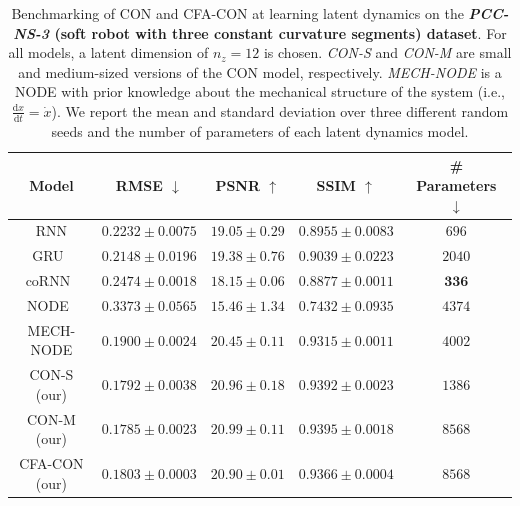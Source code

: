 \begin{table}[ht]
    \centering
    \begin{small}
    \begin{tabular}{c c c c c}
         \toprule
         \textbf{Model} & \textbf{RMSE} $\downarrow$ & \textbf{PSNR} $\uparrow$ & \textbf{SSIM} $\uparrow$ & \textbf{\# Parameters} $\downarrow$ \\
         \midrule
         RNN & $0.2232 \pm 0.0075$ & $19.05 \pm 0.29$ & $0.8955 \pm 0.0083$ & $696$\\
         GRU~\cite{cho2014learning} & $0.2148 \pm 0.0196$ & $19.38 \pm 0.76$ & $0.9039 \pm 0.0223$ & $2040$\\
         coRNN~\cite{rusch2020coupled} & $0.2474 \pm 0.0018$ & $18.15 \pm 0.06$ & $0.8877 \pm 0.0011$ & $\mathbf{336}$\\
         NODE~\cite{chen2018neural} & $0.3373 \pm 0.0565$ & $15.46 \pm 1.34$ & $0.7432 \pm 0.0935$ & $4374$\\
         MECH-NODE & $0.1900 \pm 0.0024$ & $20.45 \pm 0.11$ & $0.9315 \pm 0.0011$ & $4002$\\
         CON-S (our) & $\mathbf{0.1792 \pm 0.0038}$ & $\mathbf{20.96 \pm 0.18}$ & $\mathbf{0.9392 \pm 0.0023}$ & $1386$\\
         CON-M (our) & $\mathbf{0.1785 \pm 0.0023}$ & $\mathbf{20.99 \pm 0.11}$ & $\mathbf{0.9395 \pm 0.0018}$ & $8568$\\
         CFA-CON (our) & $0.1803 \pm 0.0003$ & $20.90 \pm 0.01$ & $0.9366 \pm 0.0004$ & $8568$\\
         \bottomrule
    \end{tabular}
    \end{small}
    \vspace{0.5cm}
    \caption{Benchmarking of \gls{CON} and \gls{CFA-CON} at learning latent dynamics on the \textbf{\emph{PCC-NS-3} (soft robot with three constant curvature segments) dataset}. For all models, a latent dimension of $n_z=12$ is chosen. \emph{CON-S} and \emph{CON-M} are small and medium-sized versions of the \gls{CON} model, respectively. \emph{MECH-NODE} is a \gls{NODE} with prior knowledge about the mechanical structure of the system (i.e., $\frac{\mathrm{d}x}{\mathrm{d}t} = \dot{x}$). We report the mean and standard deviation over three different random seeds and the number of parameters of each latent dynamics model.
}
    \label{tab:apx-con:latent_dynamics_results:pcc_ns-3}
\end{table}

